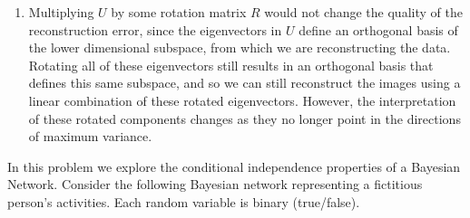 \documentclass[submit]{harvardml}
\newcommand{\attr}[1]{\textsf{#1}}
\begin{document}
\begin{enumerate}
  \item Multiplying $U$ by some rotation matrix $R$ would not change the quality of the reconstruction error, since the eigenvectors in $U$ define an orthogonal basis of the lower dimensional subspace, from which we are reconstructing the data. Rotating all of these eigenvectors still results in an orthogonal basis that defines this same subspace, and so we can still reconstruct the images using a linear combination of these rotated eigenvectors. However, the interpretation of these rotated components changes as they no longer point in the directions of maximum variance.
\end{enumerate}

\newpage

\begin{problem}

% 
% 

  
  \noindent In this problem we explore the conditional independence
  properties of a Bayesian Network.  Consider the following Bayesian
  network representing a fictitious person's activities. Each random
  variable is binary (true/false).

\begin{center}
\end{center}


\end{problem}
\end{document}
